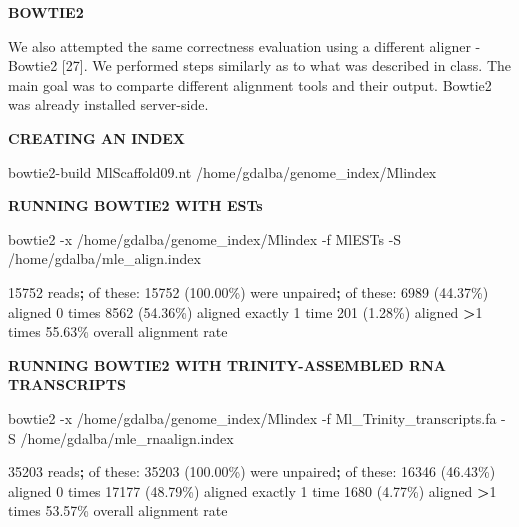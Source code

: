 \documentclass[
]{article}
\newenvironment{Shaded}{\begin{snugshade}}{\end{snugshade}}
\newcommand{\ExtensionTok}[1]{#1}
\newcommand{\KeywordTok}[1]{\textcolor[rgb]{0.13,0.29,0.53}{\textbf{#1}}}
\newcommand{\NormalTok}[1]{#1}
\newcommand{\OperatorTok}[1]{\textcolor[rgb]{0.81,0.36,0.00}{\textbf{#1}}}
\begin{document}
\textbf{BOWTIE2}

We also attempted the same correctness evaluation using a different
aligner - Bowtie2 {[}27{]}. We performed steps similarly as to what was
described in class. The main goal was to comparte different alignment
tools and their output. Bowtie2 was already installed server-side.

\textbf{CREATING AN INDEX}

\begin{Shaded}
\begin{Highlighting}[]
\ExtensionTok{bowtie2{-}build}\NormalTok{ MlScaffold09.nt /home/gdalba/genome\_index/Mlindex}
\end{Highlighting}
\end{Shaded}

\textbf{RUNNING BOWTIE2 WITH ESTs}

\begin{Shaded}
\begin{Highlighting}[]
\ExtensionTok{bowtie2}\NormalTok{ {-}x /home/gdalba/genome\_index/Mlindex {-}f MlESTs {-}S /home/gdalba/mle\_align.index}

\ExtensionTok{15752}\NormalTok{ reads}\KeywordTok{;} \ExtensionTok{of}\NormalTok{ these:}
  \ExtensionTok{15752}\NormalTok{ (100.00\%) }\ExtensionTok{were}\NormalTok{ unpaired}\KeywordTok{;} \ExtensionTok{of}\NormalTok{ these:}
    \ExtensionTok{6989}\NormalTok{ (44.37\%) }\ExtensionTok{aligned}\NormalTok{ 0 times}
    \ExtensionTok{8562}\NormalTok{ (54.36\%) }\ExtensionTok{aligned}\NormalTok{ exactly 1 time}
    \ExtensionTok{201}\NormalTok{ (1.28\%) }\ExtensionTok{aligned} \OperatorTok{\textgreater{}}\NormalTok{1 times}
\ExtensionTok{55.63\%}\NormalTok{ overall alignment rate}
\end{Highlighting}
\end{Shaded}

\textbf{RUNNING BOWTIE2 WITH TRINITY-ASSEMBLED RNA TRANSCRIPTS}

\begin{Shaded}
\begin{Highlighting}[]
\ExtensionTok{bowtie2}\NormalTok{ {-}x /home/gdalba/genome\_index/Mlindex {-}f Ml\_Trinity\_transcripts.fa {-}S /home/gdalba/mle\_rnaalign.index}


\ExtensionTok{35203}\NormalTok{ reads}\KeywordTok{;} \ExtensionTok{of}\NormalTok{ these:}
  \ExtensionTok{35203}\NormalTok{ (100.00\%) }\ExtensionTok{were}\NormalTok{ unpaired}\KeywordTok{;} \ExtensionTok{of}\NormalTok{ these:}
    \ExtensionTok{16346}\NormalTok{ (46.43\%) }\ExtensionTok{aligned}\NormalTok{ 0 times}
    \ExtensionTok{17177}\NormalTok{ (48.79\%) }\ExtensionTok{aligned}\NormalTok{ exactly 1 time}
    \ExtensionTok{1680}\NormalTok{ (4.77\%) }\ExtensionTok{aligned} \OperatorTok{\textgreater{}}\NormalTok{1 times}
\ExtensionTok{53.57\%}\NormalTok{ overall alignment rate}
\end{Highlighting}
\end{Shaded}
\end{document}
